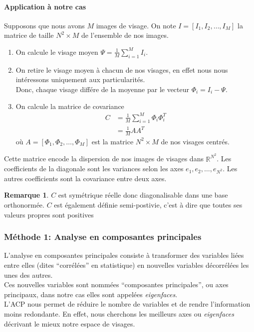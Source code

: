 \documentclass[12pt,french]{article}
\theoremstyle{plain}
\theoremstyle{definition}
\newtheorem{rmq}{Remarque}
\begin{document}
\paragraph{Application à notre cas}
Supposons que nous avons $M$ images de visage. On note $I = [I_1, I_2, \dotsc, I_M]$ la matrice de taille $N^2 \times M$ de l'ensemble de nos images.
\begin{enumerate}
\item On calcule le visage moyen $\Psi = \frac{1}{M}\displaystyle\sum_{i=1}^{M} I_i$.
\item On retire le visage moyen à chacun de nos visages, en effet nous nous intéressons uniquement aux particularités.\\
  Donc, chaque visage différe de la moyenne par le vecteur $\Phi_i = I_i - \Psi$.
\item On calcule la matrice de covariance
  \begin{align*}
    C &= \frac{1}{M} \displaystyle\sum_{i=1}^{M} \Phi_i \Phi_i^T \\
      &= \frac{1}{M} AA^T
  \end{align*}
  où $A = [\Phi_1,\Phi_2,\dotsc,\Phi_M]$ est la matrice $N^2 \times M$ de nos visages centrés.
\end{enumerate}
Cette matrice encode la dispersion de nos images de visages dans $\mathbb{R}^{N^2}$. Les coefficients de la diagonale sont les variances selon les axes $e_1, e_2, \dots, e_{N^2}$.
Les autres coefficients sont la covariance entre deux axes.

\begin{rmq}
  $C$ est symétrique réelle donc diagonalisable dans une base orthonormée. $C$ est également définie semi-postivie, c'est à dire que toutes ses valeurs propres sont positives
\end{rmq}

\subsubsection{Méthode 1: Analyse en composantes principales}
L'analyse en composantes principales consiste à transformer des variables liées entre elles (dites ``corrélées'' en statistique) en nouvelles variables décorrélées les unes des autres.\\
Ces nouvelles variables sont nommées ``composantes principales'', ou axes principaux, dans notre cas elles sont appelées \emph{eigenfaces}.\\
L'ACP nous permet de réduire le nombre de variables et de rendre l'information moins redondante. En effet, nous cherchons les meilleurs axes ou \emph{eigenfaces} décrivant le mieux notre espace de visages.\\
\end{document}
